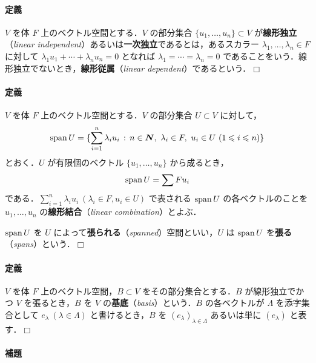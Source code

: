 \documentclass[pandoc,base=10pt,b5j,precisetext]{bxjsarticle}
\let\oldparagraph\paragraph
\renewcommand{\paragraph}[1]{\oldparagraph{#1}\mbox{}}
\begin{document}
\hypertarget{linear-independence}{%
\paragraph{定義}\label{linear-independence}}

\(V\) を体 \(F\) 上のベクトル空間とする．\(V\) の部分集合
\(\{ u_1, \dotsc, u_n \} \subset V\) が\textbf{線形独立}（\emph{linear
independent}）あるいは\textbf{一次独立}であるとは，あるスカラー
\(\lambda_1, \dotsc, \lambda_n \in F\) に対して
\(\lambda_1 u_1 + \dotsb + \lambda_n u_n = 0\) となれば
\(\lambda_1 = \dotsb = \lambda_n = 0\)
であることをいう．線形独立でないとき，\textbf{線形従属}（\emph{linear
dependent}）であるという．\(\Box\)

\hypertarget{spanned-space}{%
\paragraph{定義}\label{spanned-space}}

\(V\) を体 \(F\) 上のベクトル空間とする．\(V\) の部分集合
\(U \subset V\) に対して， \[
\mathop{\mathrm{span}} U = \{ \sum_{i = 1}^n \lambda_i u_i \,:\, n \in \boldsymbol{N},\ \lambda_i \in F,\ u_i \in U \ (1 \leqslant i \leqslant n) \}
\] とおく．\(U\) が有限個のベクトル \(\{ u_1, \dotsc, u_n \}\)
から成るとき， \[
\mathop{\mathrm{span}} U = \sum Fu_i
\]
である．\(\sum_{i = 1}^n \lambda_i u_i \ (\lambda_i \in F, u_i \in U)\)
で表される \(\mathop{\mathrm{span}} U\) の各ベクトルのことを \(u_1, \dotsc, u_n\)
の\textbf{線形結合}（\emph{linear combination}）とよぶ．

\(\mathop{\mathrm{span}} U\) を \(U\)
によって\textbf{張られる}（\emph{spanned}）空間といい，\(U\) は
\(\mathop{\mathrm{span}} U\) を\textbf{張る}（\emph{spans}）という．\(\Box\)

\hypertarget{basis-for-vector-space}{%
\paragraph{定義}\label{basis-for-vector-space}}

\(V\) を体 \(F\) 上のベクトル空間，\(B \subset V\)
をその部分集合とする．\(B\) が線形独立でかつ \(V\) を張るとき，\(B\) を
\(V\) の\textbf{基底}（\emph{basis}）という．\(B\) の各ベクトルが
\(\Lambda\) を添字集合として \(e_\lambda \ (\lambda \in \Lambda)\)
と書けるとき，\(B\) を \((e_\lambda)_{\lambda \in \Lambda}\)
あるいは単に \((e_\lambda)\) と表す．\(\Box\)

\hypertarget{number-of-basis-is-inv}{%
\paragraph{補題}\label{number-of-basis-is-inv}}
\end{document}
